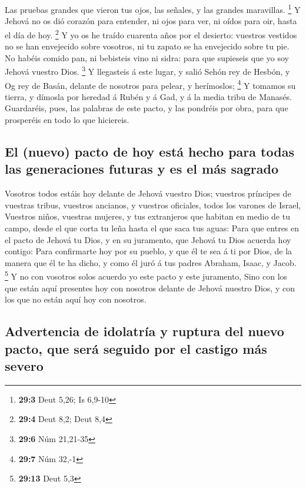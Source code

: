  Las pruebas grandes que vieron tus ojos, las señales, y
las grandes maravillas. \footnote{\textbf{29:3} Deut 5,26; Is 6,9-10}
 Y Jehová no os dió corazón para entender, ni ojos para
ver, ni oídos para oir, hasta el día de hoy. \footnote{\textbf{29:4}
  Deut 8,2; Deut 8,4}  Y yo os he traído cuarenta años por
el desierto: vuestros vestidos no se han envejecido sobre vosotros, ni
tu zapato se ha envejecido sobre tu pie.  No habéis comido
pan, ni bebisteis vino ni sidra: para que supieseis que yo soy Jehová
vuestro Dios. \footnote{\textbf{29:6} Núm 21,21-35}  Y
llegasteis á este lugar, y salió Sehón rey de Hesbón, y Og rey de Basán,
delante de nosotros para pelear, y herímoslos; \footnote{\textbf{29:7}
  Núm 32,-1}  Y tomamos su tierra, y dímosla por heredad á
Rubén y á Gad, y á la media tribu de Manasés.  Guardaréis,
pues, las palabras de este pacto, y las pondréis por obra, para que
prosperéis en todo lo que hiciereis.

\hypertarget{el-nuevo-pacto-de-hoy-estuxe1-hecho-para-todas-las-generaciones-futuras-y-es-el-muxe1s-sagrado}{%
\subsection{El (nuevo) pacto de hoy está hecho para todas las
generaciones futuras y es el más
sagrado}\label{el-nuevo-pacto-de-hoy-estuxe1-hecho-para-todas-las-generaciones-futuras-y-es-el-muxe1s-sagrado}}

 Vosotros todos estáis hoy delante de Jehová vuestro
Dios; vuestros príncipes de vuestras tribus, vuestros ancianos, y
vuestros oficiales, todos los varones de Israel, 
Vuestros niños, vuestras mujeres, y tus extranjeros que habitan en medio
de tu campo, desde el que corta tu leña hasta el que saca tus aguas:
 Para que entres en el pacto de Jehová tu Dios, y en su
juramento, que Jehová tu Dios acuerda hoy contigo:  Para
confirmarte hoy por su pueblo, y que él te sea á ti por Dios, de la
manera que él te ha dicho, y como él juró á tus padres Abraham, Isaac, y
Jacob. \footnote{\textbf{29:13} Deut 5,3}  Y no con
vosotros solos acuerdo yo este pacto y este juramento, 
Sino con los que están aquí presentes hoy con nosotros delante de Jehová
nuestro Dios, y con los que no están aquí hoy con nosotros.

\hypertarget{advertencia-de-idolatruxeda-y-ruptura-del-nuevo-pacto-que-seruxe1-seguido-por-el-castigo-muxe1s-severo}{%
\subsection{Advertencia de idolatría y ruptura del nuevo pacto, que será
seguido por el castigo más
severo}\label{advertencia-de-idolatruxeda-y-ruptura-del-nuevo-pacto-que-seruxe1-seguido-por-el-castigo-muxe1s-severo}}

